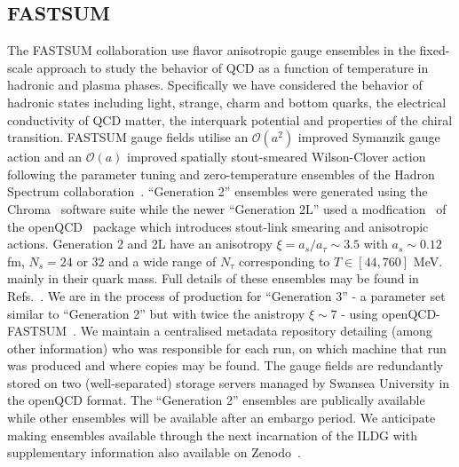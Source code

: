 \documentclass[a4paper,11pt]{article}
\begin{document}
\subsection{FASTSUM}
The FASTSUM collaboration use  flavor anisotropic gauge
ensembles in the fixed-scale approach to study the behavior of QCD as
a function of temperature in hadronic and plasma phases. Specifically
we have considered the behavior of hadronic states including light,
strange, charm and bottom quarks, the electrical conductivity of QCD
matter, the interquark potential and properties of the chiral
transition.
FASTSUM gauge fields utilise an $\mathcal{O}\left(a^2\right)$ improved
Symanzik gauge action and an $\mathcal{O}\left(a\right)$ improved
spatially stout-smeared Wilson-Clover action following the parameter
tuning and zero-temperature ensembles of the Hadron Spectrum
collaboration~\cite{Edwards:2008ja,HadronSpectrum:2008xlg}. ``Generation
2'' ensembles were generated using the Chroma~\cite{Edwards:2004sx}
software suite while the newer ``Generation 2L'' used a
modfication~\cite{glesaaen_jonas_rylund_2018_2216355} of the {\sc
  openQCD}~\cite{Luscher:2012av,openqcd} package which introduces
stout-link smearing and anisotropic actions. Generation 2 and 2L have
an anisotropy $\xi = a_s/a_\tau \sim 3.5$ with $a_s\sim 0.12$ fm, $N_s
= 24$ or $32$ and a wide range of $N_\tau$ corresponding to $T
\in[44,760]$ MeV. %
mainly in their quark mass.  Full details of these ensembles may be
found in Refs.~\cite{Aarts:2014nba,Aarts:2020vyb}. We are in the
process of production for ``Generation 3'' - a parameter set similar
to ``Generation 2'' but with twice the anistropy $\xi \sim 7$ - using
{\sc openQCD-FASTSUM}~\cite{glesaaen_jonas_rylund_2018_2216355}.
We maintain a centralised metadata repository detailing (among other
information) who was responsible for each run, on which machine that
run was produced and where copies may be found. The gauge fields are
redundantly stored on two (well-separated) storage servers managed by
Swansea University in the openQCD format. The ``Generation 2''
ensembles are publically available~\cite{aarts_2024_8403827} while
other ensembles will be available after an embargo period. We
anticipate making ensembles available through the next incarnation of
the ILDG with supplementary information also available on
Zenodo~\cite{zenodo,aarts_2024_8403827}.
\end{document}
